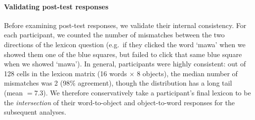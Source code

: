 %
%

\paragraph{Validating post-test responses}

Before examining post-test responses, we validate their internal consistency.
For each participant, we counted the number of mismatches between the two directions of the lexicon question (e.g.\ if they clicked the word `mawa' when we showed them one of the blue squares, but failed to click that same blue square when we showed `mawa'). 
In general, participants were highly consistent: out of 128 cells in the lexicon matrix (16 words $\times$ 8 objects), the median number of mismatches was 2 (98\% agreement), though the distribution has a long tail (mean $= 7.3$). 
We therefore conservatively take a participant's final lexicon to be the \emph{intersection} of their word-to-object and object-to-word responses for the subsequent analyses.

